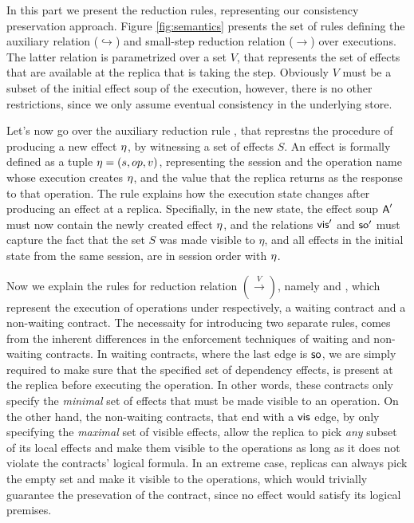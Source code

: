 In this part we present the reduction rules, representing our
consistency preservation approach.
Figure \ref{fig:semantics} presents the set of rules defining the
auxiliary relation ($\hookrightarrow$) and small-step reduction relation 
($\rightarrow$) over executions. The latter relation is parametrized
over a set $V$,
that represents the set of effects that are available at the replica
that is 
taking the step. Obviously $V$ must be a subset of the initial effect soup 
of the execution, however, there is no other restrictions,
since we only assume eventual consistency in the underlying store.

Let's now go over the auxiliary reduction rule
,
that represtns the procedure of producing a new effect $\eta$, by witnessing a set
of effects $S$. 
An effect is formally defined as a tuple $\eta=(s,op,v)$, representing the
session and the operation name 
whose execution creates $\eta$, and the value
that the replica returns as the response to that operation.
The rule explains how the execution state changes after producing an
effect at a replica. Specifially, in the new state, the effect soup
${\normalfont \textsf{A}}'$ must
now contain the newly created effect $\eta$, and the relations ${\normalfont \textsf{vis}}'$
and ${\normalfont \textsf{so}}'$ must capture the fact that the set $S$ was made
visible to $\eta$, and all effects in the initial state from the same
session, are in session order with $\eta$.

Now we explain the rules for reduction relation $(\xrightarrow{V})$,
namely   and
, which represent the execution of operations
under  respectively, a waiting contract and a non-waiting contract. 
The necessaity for introducing two separate  rules, comes from the
inherent differences in the enforcement techniques of
waiting and non-waiting contracts. In waiting contracts, where the last
edge is ${\normalfont \textsf{so}}$, we are simply required to make sure that the
specified set of dependency effects, is
present at the replica before executing the operation.
In other words, these contracts only specify
the \emph{minimal} set of effects that must be made visible to an
operation. On the other hand, the non-waiting contracts, that end with a
${\normalfont \textsf{vis}}$ edge, by only specifying the \emph{maximal} set of visible
effects, allow the replica to pick \emph{any} subset of its local
effects and make them visible to the operations as long as it does not
violate the contracts' logical formula. In an extreme case, replicas can
always pick the empty set and make it visible to the operations, which
would trivially guarantee the presevation of the contract, since no effect
would satisfy its logical premises.

